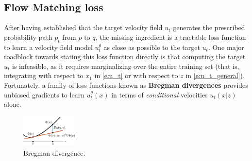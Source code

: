\documentclass{fairmeta}
\newcommand{\highlight}[1]{{\color{metablue} \textbf{#1}}}
\numberwithin{equation}{section}
\begin{document}
\subsection{Flow Matching loss}\label{s:flow_matching_loss}

After having established that the target velocity field $u_t$ generates the prescribed probability path $p_t$ from $p$ to $q$, the missing ingredient is a tractable loss function to learn a velocity field model $u_t^\theta$ as close as possible to the target $u_t$.
One major roadblock towards stating this loss function directly is that computing the target $u_t$ is infeasible, as it requires marginalizing over the entire training set (that is, integrating with respect to $x_1$ in \cref{e:u_t} or with respect to $z$ in \cref{e:u_t_general}).
Fortunately, a family of loss functions known as \highlight{Bregman divergences} provides unbiased gradients to learn $u_t^\theta(x)$ in terms of \emph{conditional} velocities $u_t(x|z)$ alone.

\begin{figure}
  \begin{center}    \includegraphics[width=0.25\textwidth]{assets/bregman.pdf}
  \end{center}
  \caption{Bregman divergence.}\label{fig:bregman}
\end{figure}
\end{document}
